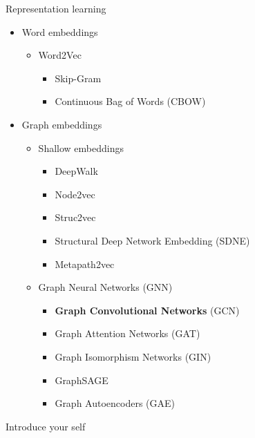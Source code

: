 \documentclass[aspectratio=169]{beamer}
\renewcommand{\alert}[1]{\textbf{\color{swufe}#1}}
\newcommand{\alertplain}[1]{{\color{swufe}#1}}
\begin{document}
        \begin{frame}{Representation learning}
            \begin{itemize}
                \item Word embeddings
                \begin{itemize}
                    \item Word2Vec
                    \begin{itemize}
                        \item \alertplain{Skip-Gram}
                        \item Continuous Bag of Words (CBOW)
                    \end{itemize}
                \end{itemize}
                \item Graph embeddings
                \begin{itemize}
                    \item Shallow embeddings
                    \begin{itemize}
                        \item \alertplain{DeepWalk}
                        \item \alertplain{Node2vec}
                        \item Struc2vec
                        \item Structural Deep Network Embedding (SDNE)
                        \item Metapath2vec
                    \end{itemize}
                    \item Graph Neural Networks (GNN)
                    \begin{itemize}
                        \item \alert{Graph Convolutional Networks} (GCN)
                        \item Graph Attention Networks (GAT)
                        \item Graph Isomorphism Networks (GIN)
                        \item GraphSAGE
                        \item Graph Autoencoders (GAE)
                    \end{itemize}
                \end{itemize}
            \end{itemize}

            \begin{note}
                {Introduce your self}
            \end{note}
        \end{frame}
\end{document}
